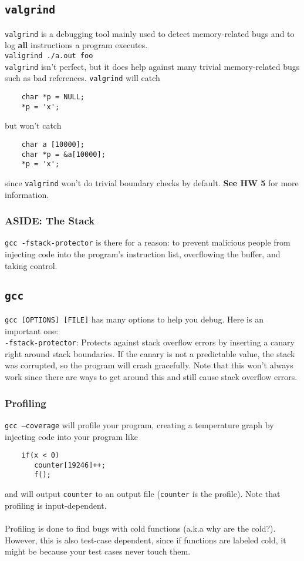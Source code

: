 \documentclass[13pt]{article}
\begin{document}
\subsection{\texttt{valgrind}}
\texttt{valgrind} is a debugging tool mainly used to detect memory-related bugs and to log \textbf{all} instructions a program executes. \\
\texttt{valigrind ./a.out foo} \\
\texttt{valgrind} isn't perfect, but it does help against many trivial memory-related bugs such as bad references. \texttt{valgrind} will catch
\begin{verbatim}
    char *p = NULL;
    *p = 'x';
\end{verbatim}
but won't catch
\begin{verbatim}
    char a [10000];
    char *p = &a[10000];
    *p = 'x';
\end{verbatim}
since \texttt{valgrind} won't do trivial boundary checks by default. \textbf{See HW 5} for more information.

\subsubsection*{ASIDE: The Stack}
\texttt{gcc -fstack-protector} is there for a reason: to prevent malicious people from injecting code into the program's instruction list, overflowing the buffer, and taking control.





\subsection{\texttt{gcc}}
\texttt{gcc [OPTIONS] [FILE]} has many options to help you debug. Here is an important one: \\
\texttt{-fstack-protector}: Protects against stack overflow errors by inserting a canary right around stack boundaries. If the canary is not a predictable value, the stack was corrupted, so the program will crash gracefully. Note that this won't always work since there are ways to get around this and still cause stack overflow errors.

\subsubsection{Profiling}
\texttt{gcc --coverage} will profile your program, creating a temperature graph by injecting code into your program like
\begin{verbatim}
    if(x < 0)
       counter[19246]++;
       f();
\end{verbatim}
and will output \texttt{counter} to an output file (\texttt{counter} is the profile). Note that profiling is input-dependent. \\ \\
Profiling is done to find bugs with cold functions (a.k.a why are the cold?). However, this is also test-case dependent, since if functions are labeled cold, it might be because your test cases never touch them.
\end{document}
